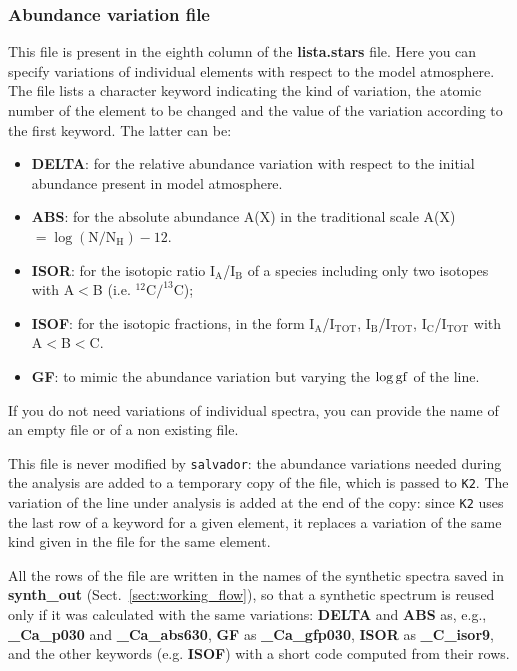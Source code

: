\documentclass[modern]{aastex701}
\begin{document}
\subsubsection{Abundance variation file} \label{sect:abu_var}
This file is present in the eighth column of the \textbf{lista.stars} file. Here you can specify variations of individual elements with respect to the model atmosphere. The file lists a character keyword indicating the kind of variation, the atomic number of the element to be changed and the value of the variation according to the first keyword. The latter can be:
\begin{itemize}
    \item {\bf DELTA}: for the relative abundance variation with respect to the initial abundance present in model atmosphere. 
    \item {\bf ABS}: for the absolute abundance A(X) in the traditional scale A(X) $=\log \mathrm{(N/N_H)} - 12$.
    \item {\bf ISOR}: for the isotopic ratio I$_\mathrm{A}$/I$_\mathrm{B}$ of a species including only two isotopes with A$<$B (i.e. $^{12}\mathrm{C}/^{13}\mathrm{C}$);
    \item {\bf ISOF}: for the isotopic fractions, in the form I$_\mathrm{A}$/I$_{\mathrm{TOT}}$, I$_\mathrm{B}$/I$_{\mathrm{TOT}}$, I$_\mathrm{C}$/I$_{\mathrm{TOT}}$ with A$<$B$<$C.
    \item {\bf GF}: to mimic the abundance variation but varying the $\rm \log gf$ of the line. 
\end{itemize}

If you do not need variations of individual spectra, you can provide the name of an empty file or of a non existing file. 

This file is never modified by \texttt{salvador}: the abundance variations needed during the analysis are added to a temporary copy of the file, which is passed to \texttt{K2}. The variation of the line under analysis is added at the end of the copy: since \texttt{K2} uses the last row of a keyword for a given element, it replaces a variation of the same kind given in the file for the same element.

All the rows of the file are written in the names of the synthetic spectra saved in {\bf synth\_out} (Sect.~\ref{sect:working_flow}), so that a synthetic spectrum is reused only if it was calculated with the same variations: {\bf DELTA} and {\bf ABS} as, e.g., {\bf \_Ca\_p030} and {\bf \_Ca\_abs630}, {\bf GF} as {\bf \_Ca\_gfp030}, {\bf ISOR} as {\bf \_C\_isor9}, and the other keywords (e.g. {\bf ISOF}) with a short code computed from their rows.
\end{document}
